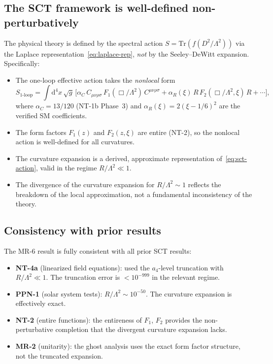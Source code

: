 \documentclass[11pt,a4paper]{article}
\renewcommand{\dd}{\mathrm{d}}
\newcommand{\Lam}{\Lambda}
\theoremstyle{plain}
\theoremstyle{definition}
\begin{document}
\subsection{The SCT framework is well-defined non-perturbatively}

The physical theory is defined by the spectral action
$S = \mathrm{Tr}(f(D^2/\Lam^2))$ via the Laplace
representation~\eqref{eq:laplace-rep}, \emph{not} by the Seeley--DeWitt
expansion.  Specifically:

\begin{itemize}
  \item The one-loop effective action takes the \emph{nonlocal} form
    \begin{equation}\label{eq:sct-action}
      S_{\text{1-loop}} = \int \dd^4 x\,\sqrt{g}\,\bigl[
        \alpha_C\, C_{\mu\nu\rho\sigma}\,F_1(\Box/\Lam^2)\,C^{\mu\nu\rho\sigma}
        + \alpha_R(\xi)\, R\,F_2(\Box/\Lam^2,\xi)\, R + \cdots\bigr],
    \end{equation}
    where $\alpha_C = 13/120$ (NT-1b Phase~3) and
    $\alpha_R(\xi) = 2(\xi - 1/6)^2$ are the verified SM coefficients.

  \item The form factors $F_1(z)$ and $F_2(z,\xi)$ are entire
    (NT-2), so the nonlocal action is well-defined for all curvatures.

  \item The curvature expansion is a derived, approximate representation
    of~\eqref{eq:sct-action}, valid in the regime $R/\Lam^2 \ll 1$.

  \item The divergence of the curvature expansion for $R/\Lam^2 \sim 1$
    reflects the breakdown of the local approximation, not a fundamental
    inconsistency of the theory.
\end{itemize}

\subsection{Consistency with prior results}

The MR-6 result is fully consistent with all prior SCT results:

\begin{itemize}
  \item \textbf{NT-4a} (linearized field equations): used the $a_4$-level
    truncation with $R/\Lam^2 \ll 1$.  The truncation error is $< 10^{-999}$
    in the relevant regime.
  \item \textbf{PPN-1} (solar system tests): $R/\Lam^2 \sim 10^{-50}$.
    The curvature expansion is effectively exact.
  \item \textbf{NT-2} (entire functions): the entireness of $F_1$, $F_2$
    provides the non-perturbative completion that the divergent curvature
    expansion lacks.
  \item \textbf{MR-2} (unitarity): the ghost analysis uses the exact
    form factor structure, not the truncated expansion.
\end{itemize}
\end{document}
